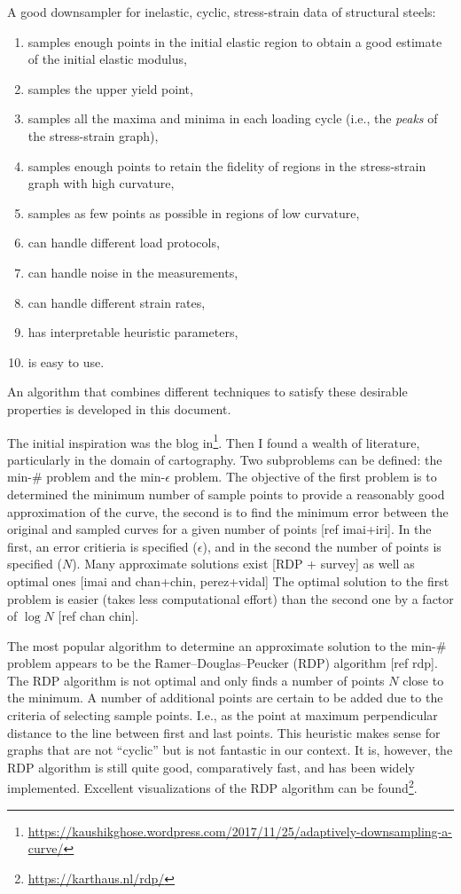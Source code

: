 \documentclass[a4paper,11pt]{article}
\begin{document}
A good downsampler for inelastic, cyclic, stress-strain data of structural steels:
\begin{enumerate}
    \item samples enough points in the initial elastic region to obtain a good estimate of the initial elastic modulus,
    \item samples the upper yield point,
    \item samples all the maxima and minima in each loading cycle (i.e., the \emph{peaks} of the stress-strain graph),
    \item samples enough points to retain the fidelity of regions in the stress-strain graph with high curvature,
    \item samples as few points as possible in regions of low curvature,
    \item can handle different load protocols,
    \item can handle noise in the measurements,
    \item can handle different strain rates,
    \item has interpretable heuristic parameters,
    \item is easy to use.
\end{enumerate}
An algorithm that combines different techniques to satisfy these desirable properties is developed in this document.

The initial inspiration was the blog in\footnote{\label{fn:blog}\url{https://kaushikghose.wordpress.com/2017/11/25/adaptively-downsampling-a-curve/}}.
Then I found a wealth of literature, particularly in the domain of cartography.
Two subproblems can be defined: the min-\# problem and the min-$\epsilon$ problem.
The objective of the first problem is to determined the minimum number of sample points to provide a reasonably good approximation of the curve, the second is to find the minimum error between the original and sampled curves for a given number of points [ref imai+iri].
In the first, an error critieria is specified ($\epsilon$), and in the second the number of points is specified ($N$).
Many approximate solutions exist [RDP + survey] as well as optimal ones [imai and chan+chin, perez+vidal]
The optimal solution to the first problem is easier (takes less computational effort) than the second one by a factor of $\log N$ [ref chan 
chin].

The most popular algorithm to determine an approximate solution to the min-\# problem appears to be the Ramer–Douglas–Peucker (RDP) algorithm [ref rdp].
The RDP algorithm is not optimal and only finds a number of points $N$ close to the minimum.
A number of additional points are certain to be added due to the criteria of selecting sample points.
I.e., as the point at maximum perpendicular distance to the line between first and last points.
This heuristic makes sense for graphs that are not ``cyclic'' but is not fantastic in our context.
It is, however, the RDP algorithm is still quite good, comparatively fast, and has been widely implemented.
Excellent visualizations of the RDP algorithm can be found\footnote{\url{https://karthaus.nl/rdp/}}.
\end{document}
